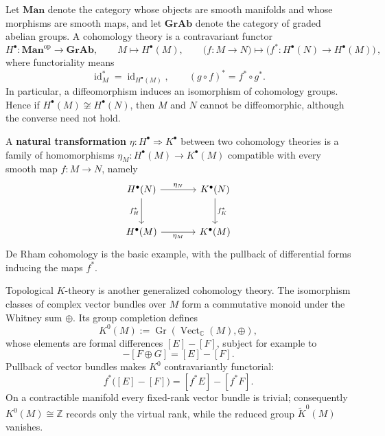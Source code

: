 \documentclass[../geometry_main.tex]{subfiles}
\begin{document}
\begin{mytheorem}
Let $\mathbf{Man}$ denote the category whose objects are smooth manifolds and whose morphisms are smooth maps, and let $\mathbf{GrAb}$ denote the category of graded abelian groups.
A cohomology theory is a contravariant functor
\begin{equation}
    H^\bullet:\mathbf{Man}^{\mathrm{op}}\longrightarrow\mathbf{GrAb},
    \qquad
    M\longmapsto H^\bullet(M),
    \qquad
    \big(f:M\to N\big)\longmapsto
    \big(f^*:H^\bullet(N)\to H^\bullet(M)\big)\,,
\end{equation}
where functoriality means
\begin{equation}
    \operatorname{id}_M^*=\operatorname{id}_{H^\bullet(M)},
    \qquad
    (g\circ f)^*=f^*\circ g^*.
\end{equation}
In particular, a diffeomorphism induces an isomorphism of cohomology groups.
Hence if $H^\bullet(M)\not\cong H^\bullet(N)$, then $M$ and $N$ cannot be diffeomorphic, although the converse need not hold.

A \textbf{natural transformation} $\eta:H^\bullet\Rightarrow K^\bullet$ between two cohomology theories is a family of homomorphisms
$\eta_M:H^\bullet(M)\to K^\bullet(M)$ compatible with every smooth map $f:M\to N$, namely
\begin{equation}
\begin{tikzcd}[
    row sep=large,
    column sep=large,
    ampersand replacement=\&
]
    H^\bullet(N)
        \arrow[r, "\eta_N"]
        \arrow[d, "f_H^*"']
    \&
    K^\bullet(N)
        \arrow[d, "f_K^*"]
    \\
    H^\bullet(M)
        \arrow[r, "\eta_M"']
    \&
    K^\bullet(M)
\end{tikzcd}
\end{equation}
De Rham cohomology is the basic example, with the pullback of differential forms inducing the maps $f^*$.

Topological $K$-theory is another generalized cohomology theory.
The isomorphism classes of complex vector bundles over $M$ form a commutative monoid under the Whitney sum $\oplus$.
Its group completion defines
\begin{equation}
    K^0(M)
    :=\operatorname{Gr}\!\left(\operatorname{Vect}_{\mathbb C}(M),\oplus\right),
\end{equation}
whose elements are formal differences $[E]-[F]$, subject for example to
\begin{equation}
    [E\oplus G]-[F\oplus G]=[E]-[F].
\end{equation}
Pullback of vector bundles makes $K^0$ contravariantly functorial:
\begin{equation}
    f^*\big([E]-[F]\big)=[f^*E]-[f^*F].
\end{equation}
On a contractible manifold every fixed-rank vector bundle is trivial; consequently
$K^0(M)\cong\mathbb{Z}$ records only the virtual rank, while the reduced group
$\widetilde K^0(M)$ vanishes.
\end{mytheorem}
\end{document}
